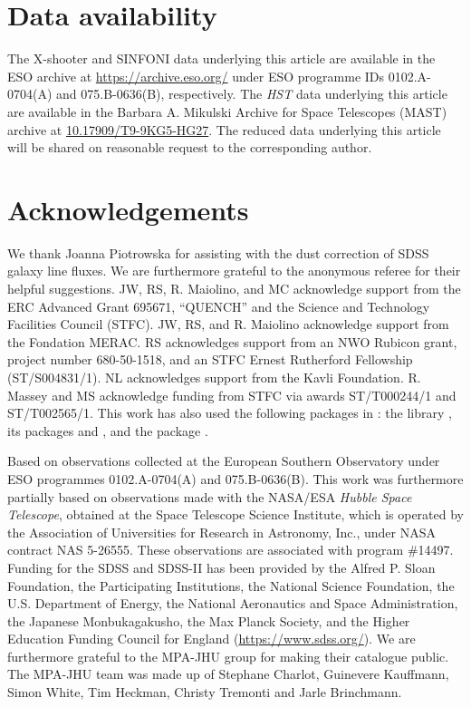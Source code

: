 \section*{Data availability}

The X-shooter and SINFONI data underlying this article are available in the ESO archive at \url{https://archive.eso.org/} under ESO programme IDs 0102.A-0704(A) and 075.B-0636(B), respectively. The \textit{HST} data underlying this article are available in the Barbara A. Mikulski Archive for Space Telescopes (MAST) archive at \href{https://dx.doi.org/10.17909/t9-9kg5-hg27}{10.17909/T9-9KG5-HG27}. The reduced data underlying this article will be shared on reasonable request to the corresponding author.

\section*{Acknowledgements}

We thank Joanna Piotrowska for assisting with the dust correction of SDSS galaxy line fluxes. We are furthermore grateful to the anonymous referee for their helpful suggestions. JW, RS, R. Maiolino, and MC acknowledge support from the ERC Advanced Grant 695671, ``QUENCH'' and the Science and Technology Facilities Council (STFC). JW, RS, and R. Maiolino acknowledge support from the Fondation MERAC. RS acknowledges support from an NWO Rubicon grant, project number 680-50-1518, and an STFC Ernest Rutherford Fellowship (ST/S004831/1). NL acknowledges support from the Kavli Foundation. R. Massey and MS acknowledge funding from STFC via awards ST/T000244/1 and ST/T002565/1. This work has also used the following packages in : the  library \citep{Jones2001}, its packages  \citep{2011CSE....13b..22V} and  \citep{Hunter2007}, and the  package \citep{2013A&A...558A..33A, 2018AJ....156..123A}.

Based on observations collected at the European Southern Observatory under ESO programmes 0102.A-0704(A) and 075.B-0636(B). This work was furthermore partially based on observations made with the NASA/ESA \textit{Hubble Space Telescope}, obtained at the Space Telescope Science Institute, which is operated by the Association of Universities for Research in Astronomy, Inc., under NASA contract NAS 5-26555. These observations are associated with program \#14497. Funding for the SDSS and SDSS-II has been provided by the Alfred P. Sloan Foundation, the Participating Institutions, the National Science Foundation, the U.S. Department of Energy, the National Aeronautics and Space Administration, the Japanese Monbukagakusho, the Max Planck Society, and the Higher Education Funding Council for England (\url{https://www.sdss.org/}). We are furthermore grateful to the MPA-JHU group for making their catalogue public. The MPA-JHU team was made up of Stephane Charlot, Guinevere Kauffmann, Simon White, Tim Heckman, Christy Tremonti and Jarle Brinchmann.